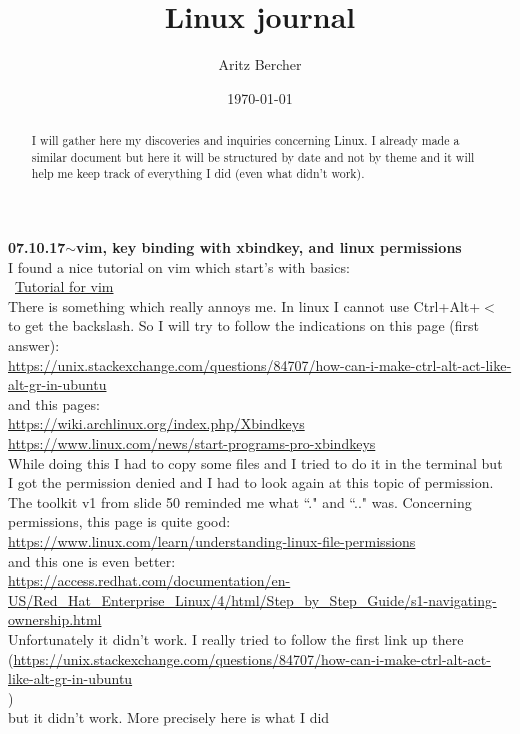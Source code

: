 \documentclass[11pt,a4paper]{article}
\title{Linux journal}
\author{Aritz Bercher}
\date{\today}
\newenvironment{loggentry}[2]%
{\noindent\textbf{#1}\hspace{1cm}$\mathbf{\sim}$\text{ }\textbf{#2}\\}{\vspace{0.5cm}}
\begin{document}
\maketitle

\begin{abstract}
I will gather here my discoveries and inquiries concerning Linux. I already made a similar document but here it will be structured by date and not by theme and it will help me keep track of everything I did (even what didn't work).
\end{abstract}

\begin{loggentry}{07.10.17}{vim, key binding with xbindkey, and linux permissions}
I found a nice tutorial on vim which start's with basics:\\\
\href{https://www.linux.com/learn/vim-101-beginners-guide-vim}{Tutorial for vim}\\
There is something which really annoys me. In linux I cannot use Ctrl+Alt+$<$ to get the backslash. So I will try to follow the indications on this page (first answer):\\
\url{https://unix.stackexchange.com/questions/84707/how-can-i-make-ctrl-alt-act-like-alt-gr-in-ubuntu}\\
and this pages:\\
\url{https://wiki.archlinux.org/index.php/Xbindkeys}\\
\url{https://www.linux.com/news/start-programs-pro-xbindkeys}\\
While doing this I had to copy some files and I tried to do it in the terminal but I got the permission denied and I had to look again at this topic of permission. The toolkit v1 from slide 50 reminded me what ``." and ``.." was. Concerning permissions, this page is quite good:\\
\url{https://www.linux.com/learn/understanding-linux-file-permissions}\\
and this one is even better:\\
\url{https://access.redhat.com/documentation/en-US/Red_Hat_Enterprise_Linux/4/html/Step_by_Step_Guide/s1-navigating-ownership.html}\\
Unfortunately it didn't work. I really tried to follow the first link up there\\
(\url{https://unix.stackexchange.com/questions/84707/how-can-i-make-ctrl-alt-act-like-alt-gr-in-ubuntu}\\)\\
but it didn't work. 
More precisely here is what I did

\end{loggentry}
\end{document}
